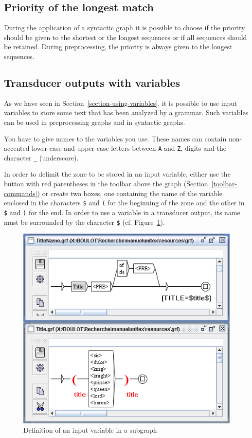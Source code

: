 \subsection{Priority of the longest match}
During the application of a syntactic graph it is possible to choose if the
priority should be given to the shortest or the longest sequences or if all
sequences should be retained. During preprocessing, the priority is always given
to the longest sequences.


\subsection{Transducer outputs with variables}
\label{section-variables}
As we have seen in Section~\ref{section-using-variables}, it is
possible to use input variables to store some text that has been analyzed by a
grammar. Such variables can be used in preprocessing graphs and in syntactic
graphs.

\bigskip
\noindent You have to give names to the variables you use. These names can
contain non-accented lower-case and upper-case letters between \verb+A+ and \verb+Z+,
digits and the character \verb+_+ (underscore).

\bigskip
\noindent In order to delimit the zone to be stored in an input variable, 
either use the button with red parentheses in the toolbar above the graph
(Section~\ref{toolbar-commands}) or create two boxes, one containing the name of the variable 
enclosed in the characters \verb-$- and \verb-(- for the beginning of the zone
and the other in \verb-$- and \verb-)- for the end.
In order to use a variable in a transducer output, its name must be
surrounded by the character \verb-$- (cf. Figure~\ref{fig-variable-definition}).

\begin{figure}[!p]
\begin{center}
\includegraphics[width=12cm]{resources/img/fig6-25.png}
\caption{Definition of an input variable in a subgraph\label{fig-variable-definition}}
\end{center}
\end{figure}

